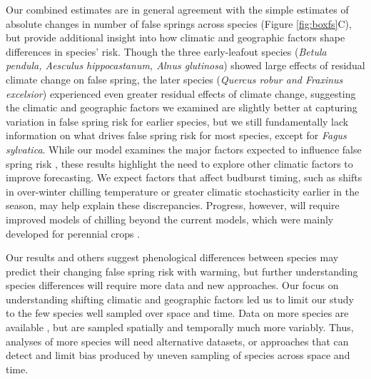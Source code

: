 \documentclass{article}\usepackage[]{graphicx}\usepackage[]{color}
\begin{document}
Our combined estimates are in general agreement with the simple estimates of absolute changes in number of false springs across species (Figure \ref{fig:boxfs}C), but provide additional insight into how climatic and geographic factors shape differences in species' risk.  Though the three early-leafout species (\textit{Betula pendula, Aesculus hippocastanum, Alnus glutinosa}) showed large effects of residual climate change on false spring, the later species (\textit{Quercus robur and Fraxinus excelsior}) experienced even greater residual effects of climate change, suggesting the climatic and geographic factors we examined are slightly better at capturing variation in false spring risk for earlier species, but we still fundamentally lack information on what drives false spring risk for most species, except for \textit{Fagus sylvatica}. While our model examines the major factors expected to influence false spring risk \citep{Liu2018,Ma2018,Vitasse2018,Wypych2016a}, these results highlight the need to explore other climatic factors to improve forecasting. We expect factors that affect budburst timing, such as shifts in over-winter chilling temperature or greater climatic stochasticity earlier in the season, may help explain these discrepancies. Progress, however, will require improved models of chilling beyond the current models, which were mainly developed for perennial crops \citep{Luedeling2011,Dennis2003}. 



Our results and others \citep{Ma2018} suggest phenological differences between species may predict their changing false spring risk with warming, but further understanding species differences will require more data and new approaches. Our focus on understanding shifting climatic and geographic factors led us to limit our study to the few species well sampled over space and time. Data on more species are available \citep[e.g., ][]{Ma2018}, but are sampled spatially and temporally much more variably. Thus, analyses of more species will need alternative datasets, or approaches that can detect and limit bias produced by uneven sampling of species across space and time.
\end{document}
